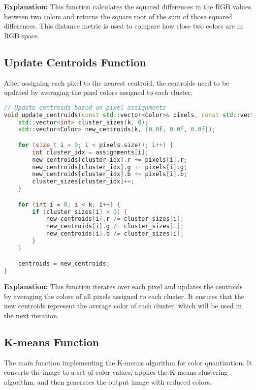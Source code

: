 \textbf{Explanation:}
This function calculates the squared differences in the RGB values between two colors and returns the square root of the sum of those squared differences. This distance metric is used to compare how close two colors are in RGB space.

\subsection{Update Centroids Function}
After assigning each pixel to the nearest centroid, the centroids need to be updated by averaging the pixel colors assigned to each cluster.

\begin{lstlisting}[language=C++]
// Update centroids based on pixel assignments
void update_centroids(const std::vector<Color>& pixels, const std::vector<int>& assignments, std::vector<Color>& centroids, int k) {
    std::vector<int> cluster_sizes(k, 0);
    std::vector<Color> new_centroids(k, {0.0f, 0.0f, 0.0f});

    for (size_t i = 0; i < pixels.size(); i++) {
        int cluster_idx = assignments[i];
        new_centroids[cluster_idx].r += pixels[i].r;
        new_centroids[cluster_idx].g += pixels[i].g;
        new_centroids[cluster_idx].b += pixels[i].b;
        cluster_sizes[cluster_idx]++;
    }

    for (int i = 0; i < k; i++) {
        if (cluster_sizes[i] > 0) {
            new_centroids[i].r /= cluster_sizes[i];
            new_centroids[i].g /= cluster_sizes[i];
            new_centroids[i].b /= cluster_sizes[i];
        }
    }

    centroids = new_centroids;
}
\end{lstlisting}

\textbf{Explanation:}
This function iterates over each pixel and updates the centroids by averaging the colors of all pixels assigned to each cluster. It ensures that the new centroids represent the average color of each cluster, which will be used in the next iteration.

\subsection{K-means Function}
The main function implementing the K-means algorithm for color quantization. It converts the image to a set of color values, applies the K-means clustering algorithm, and then generates the output image with reduced colors.

